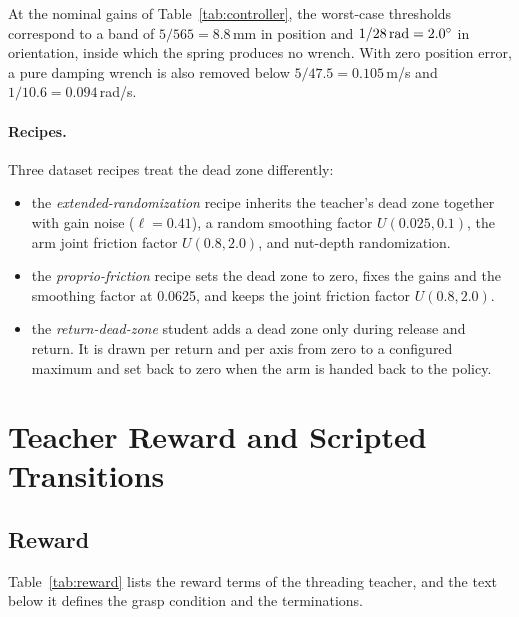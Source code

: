 At the nominal gains of Table~\ref{tab:controller}, the worst-case thresholds correspond to a band of $5/565=8.8$\,mm in position and $1/28\,\mathrm{rad}=2.0^\circ$ in orientation, inside which the spring produces no wrench. With zero position error, a pure damping wrench is also removed below $5/47.5=0.105$\,m/s and $1/10.6=0.094$\,rad/s.

\paragraph{Recipes.} Three dataset recipes treat the dead zone differently:
\begin{itemize}
  \item the \emph{extended-randomization} recipe inherits the teacher's dead zone together with gain noise ($\ell=0.41$), a random smoothing factor $U(0.025,0.1)$, the arm joint friction factor $U(0.8,2.0)$, and nut-depth randomization.
  \item the \emph{proprio-friction} recipe sets the dead zone to zero, fixes the gains and the smoothing factor at 0.0625, and keeps the joint friction factor $U(0.8,2.0)$.
  \item the \emph{return-dead-zone} student adds a dead zone only during release and return. It is drawn per return and per axis from zero to a configured maximum and set back to zero when the arm is handed back to the policy.
\end{itemize}

\section{Teacher Reward and Scripted Transitions}\label{sec:app-reward}

\subsection{Reward}

Table~\ref{tab:reward} lists the reward terms of the threading teacher, and the text below it defines the grasp condition and the terminations.

